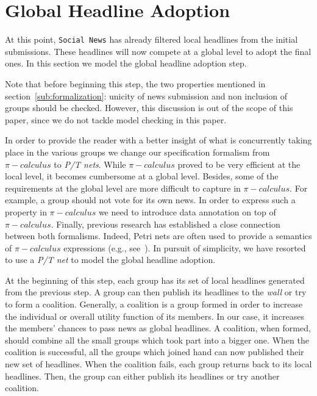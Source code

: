 \section{Global Headline Adoption} %
\label{sec:global_headline_adoption}

At this point, {\tt Social News} has already filtered local headlines from the initial submissions. These headlines will
now compete at a global level to adopt the final ones. In this section we model the global headline adoption step.

Note that before beginning this step, the two properties mentioned in section~\ref{sub:formalization}: unicity of news
submission and non inclusion of groups should be checked. However, this discussion is out of the scope of this paper,
since we do not tackle model checking in this paper.

In order to provide the reader with a better insight of what is concurrently taking place in the various groups we change
our specification formalism from $\pi-calculus$ to \emph{P/T nets}. While $\pi-calculus$ proved to be very efficient at
the local level, it becomes cumbersome at a global level. Besides, some of the requirements at the global level are more
difficult to capture in $\pi-calculus$. For example, a group should not vote for its own news. In order to express such a
property in $\pi-calculus$ we need to introduce data annotation on top of $\pi-calculus$. Finally, previous research has
established a close connection between both formalisms. Indeed, Petri nets are often used to provide a semantics of
$\pi-calculus$ expressions (e.g., see~\cite{Devillers-Klaudel-Koutny:06}). In pursuit of simplicity, we have resorted to
use a \emph{P/T net} to model the global headline adoption.

At the beginning of this step, each group has its set of local headlines generated from the previous step. A group can
then publish its headlines to the \emph{wall} or try to form a coalition. Generally, a coalition is a group formed in
order to increase the individual or overall utility function of its members. In our case, it increases the members'
chances to pass news as global headlines. A coalition, when formed, should combine all the small groups which took part
into a bigger one. When the coalition is successful, all the groups which joined hand can now published their new set of
headlines. When the coalition fails, each group returns back to its local headlines. Then, the group can either publish
its headlines or try another coalition.


